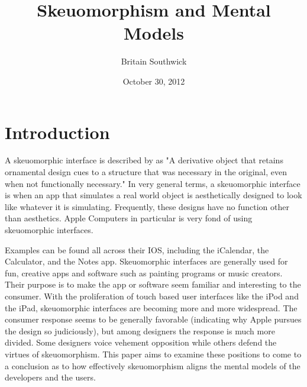 \documentclass{article}
\title{Skeuomorphism and Mental Models}
\author{Britain Southwick}
\date{October 30, 2012}
\begin{document}
\maketitle


\pagebreak
\tableofcontents

\pagebreak
\listoffigures

\pagebreak
\listoftables

\pagebreak

%
%
\section{Introduction}
\label{introduction}

A skeuomorphic interface is described by\cite{medialoot} as "A derivative object that retains ornamental design cues to a structure that was necessary in the original, even when not functionally necessary." In very general terms, a skeuomorphic interface is when an app that simulates a real world object is aesthetically designed to look like whatever it is simulating. Frequently, these designs have no function other than aesthetics. Apple Computers in particular is very fond of using skeuomorphic interfaces. 

Examples can be found all across their IOS, including the iCalendar, the Calculator, and the Notes app. Skeuomorphic interfaces are generally used for fun, creative apps and software such as painting programs or music creators. Their purpose is to make the app or software seem familiar and interesting to the consumer. With the proliferation of touch based user interfaces like the iPod and the iPad, skeuomorphic interfaces are becoming more and more widespread. The consumer response seems to be generally favorable (indicating why Apple pursues the design so judiciously), but among designers the response is much more divided. Some designers voice vehement opposition while others defend the virtues of skeuomorphism. This paper aims to examine these positions to come to a conclusion as to how effectively skeuomorphism aligns the mental models of the developers and the users.
\end{document}
